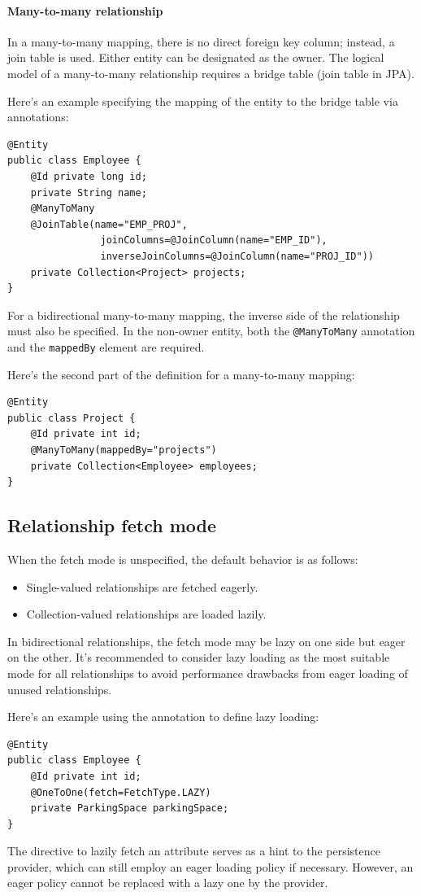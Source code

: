 \paragraph*{Many-to-many relationship}
In a many-to-many mapping, there is no direct foreign key column; instead, a join table is used. 
Either entity can be designated as the owner. 
The logical model of a many-to-many relationship requires a bridge table (join table in JPA).
\begin{example}
    Here's an example specifying the mapping of the entity to the bridge table via annotations:
\begin{lstlisting}[style=Java]
@Entity
public class Employee {
    @Id private long id;
    private String name;
    @ManyToMany
    @JoinTable(name="EMP_PROJ",
                joinColumns=@JoinColumn(name="EMP_ID"),
                inverseJoinColumns=@JoinColumn(name="PROJ_ID"))
    private Collection<Project> projects;
}
\end{lstlisting}
\end{example}
For a bidirectional many-to-many mapping, the inverse side of the relationship must also be specified. 
In the non-owner entity, both the \texttt{@ManyToMany} annotation and the \texttt{mappedBy} element are required.
\begin{example}
    Here's the second part of the definition for a many-to-many mapping:
\begin{lstlisting}[style=Java]
@Entity
public class Project {
    @Id private int id;
    @ManyToMany(mappedBy="projects")
    private Collection<Employee> employees;
}
\end{lstlisting}
\end{example}

\subsection{Relationship fetch mode}
When the fetch mode is unspecified, the default behavior is as follows:
\begin{itemize}
    \item Single-valued relationships are fetched eagerly.
    \item Collection-valued relationships are loaded lazily.
\end{itemize}
In bidirectional relationships, the fetch mode may be lazy on one side but eager on the other. 
It's recommended to consider lazy loading as the most suitable mode for all relationships to avoid performance drawbacks from eager loading of unused relationships.
\begin{example}
    Here's an example using the annotation to define lazy loading:
\begin{lstlisting}[style=Java]
@Entity
public class Employee {
    @Id private int id;
    @OneToOne(fetch=FetchType.LAZY)
    private ParkingSpace parkingSpace;
}
\end{lstlisting}
\end{example}
The directive to lazily fetch an attribute serves as a hint to the persistence provider, which can still employ an eager loading policy if necessary. 
However, an eager policy cannot be replaced with a lazy one by the provider.

